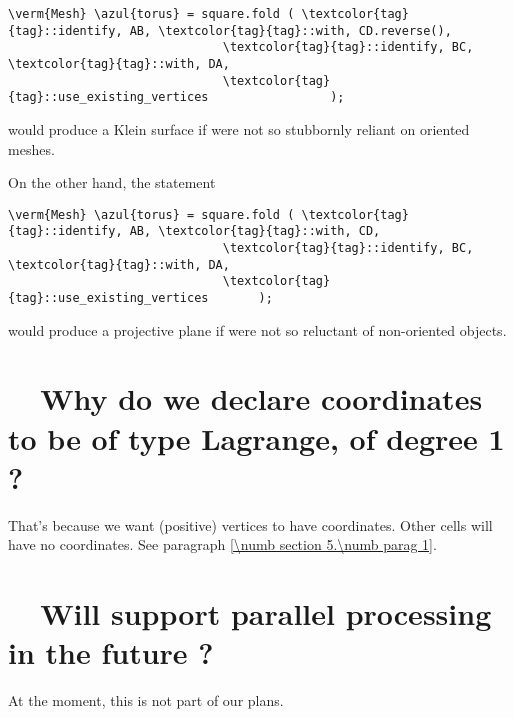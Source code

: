 \begin{Verbatim}[commandchars=\\\{\},formatcom=\small\tt,
   baselinestretch=0.94,framesep=2mm                     ]
   \verm{Mesh} \azul{torus} = square.fold ( \textcolor{tag}{tag}::identify, AB, \textcolor{tag}{tag}::with, CD.reverse(),
                              \textcolor{tag}{tag}::identify, BC, \textcolor{tag}{tag}::with, DA,
                              \textcolor{tag}{tag}::use_existing_vertices                 );
\end{Verbatim}

\noindent would produce a Klein surface if {\maniFEM} were not so stubbornly reliant on
oriented meshes.

On the other hand, the statement

\begin{Verbatim}[commandchars=\\\{\},formatcom=\small\tt,
   baselinestretch=0.94,framesep=2mm                     ]
   \verm{Mesh} \azul{torus} = square.fold ( \textcolor{tag}{tag}::identify, AB, \textcolor{tag}{tag}::with, CD,
                              \textcolor{tag}{tag}::identify, BC, \textcolor{tag}{tag}::with, DA,
                              \textcolor{tag}{tag}::use_existing_vertices       );
\end{Verbatim}

\noindent would produce a projective plane if {\maniFEM} were not so reluctant of
non-oriented objects.


\section{~~Why do we declare coordinates to be of type Lagrange, of degree 1 ?}
\label{\numb section 13.\numb parag 6}

That's because we want (positive) vertices to have coordinates.
Other cells will have no coordinates.
See paragraph \ref{\numb section 5.\numb parag 1}.


\section{~~Will {\maniFEM} support parallel processing in the future ?}
\label{\numb section 13.\numb parag 7}

At the moment, this is not part of our plans.


